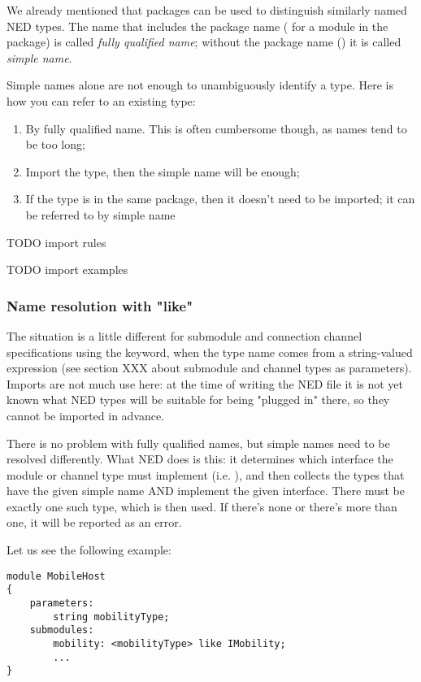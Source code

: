 We already mentioned that packages can be used to distinguish
similarly named NED types. The name that includes the package name
( for a  module in the 
package) is called \textit{fully qualified name}; without the package
name () it is called \textit{simple name}.

Simple names alone are not enough to unambiguously identify a type.
Here is how you can refer to an existing type:

\begin{enumerate}
  \item By fully qualified name. This is often cumbersome though,
        as names tend to be too long;
  \item Import the type, then the simple name will be enough;
  \item If the type is in the same package, then it doesn't need to be
        imported; it can be referred to by simple name
\end{enumerate}

TODO import rules

TODO import examples


\subsubsection{Name resolution with "like"}

The situation is a little different for submodule and connection channel
specifications using the  keyword, when the type name comes
from a string-valued expression (see section XXX about submodule and
channel types as parameters). Imports are not much use here: at the time of
writing the NED file it is not yet known what NED types will be suitable
for being "plugged in" there, so they cannot be imported in advance.

There is no problem with fully qualified names, but simple names need
to be resolved differently. What NED does is this: it determines which
interface the module or channel type must implement (i.e. ),
and then collects the types that have the given simple name AND implement
the given interface. There must be exactly one such type, which is then used.
If there's none or there's more than one, it will be reported as an error.

Let us see the following example:

\begin{Verbatim}
module MobileHost
{
    parameters:
        string mobilityType;
    submodules:
        mobility: <mobilityType> like IMobility;
        ...
}
\end{Verbatim}

